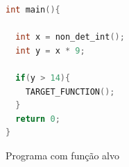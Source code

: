 \begin{figure}[H]
	\caption{\label{fig:targetFunction} Programa com função alvo}
	\begin{center}
    \begin{lstlisting}[language=C]     
int main(){

  int x = non_det_int();
  int y = x * 9;
  
  if(y > 14){
    TARGET_FUNCTION();
  }
  return 0;
}	
	\end{lstlisting}
	\end{center}
\end{figure}

